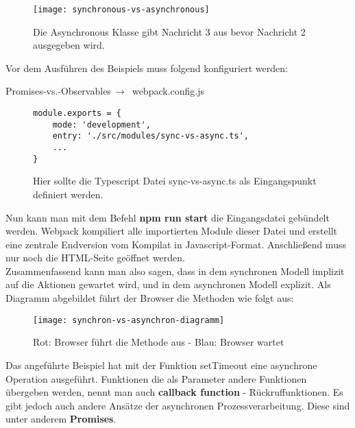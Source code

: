 \begin{figure}[H]
\centering
\texttt{[image: synchronous-vs-asynchronous]}
\caption{Die Asynchronous Klasse gibt Nachricht 3 aus bevor Nachricht 2 ausgegeben wird.}
\end{figure}

\noindent
Vor dem Ausführen des Beispiels muss folgend konfiguriert werden:
 \begin{center}
     Promises-vs.-Observables$\,\to\,$ webpack.config.js
 \end{center}

\begin{figure}[h!]
\begin{lstlisting}
module.exports = {
    mode: 'development',
    entry: './src/modules/sync-vs-async.ts',
    ...
}
\end{lstlisting}
\caption{Hier sollte die Typescript Datei sync-vs-async.ts als Eingangspunkt definiert werden.}
\end{figure}

\noindent
Nun kann man mit dem Befehl \textbf{npm run start} die Eingangsdatei gebündelt werden. Webpack kompiliert alle importierten Module dieser Datei und erstellt eine zentrale Endversion vom Kompilat in Javascript-Format. Anschließend muss nur noch die HTML-Seite geöffnet werden. \\

\noindent
Zusammenfassend kann man also sagen, dass in dem synchronen Modell implizit auf die Aktionen gewartet wird, und in dem asynchronen Modell explizit. Als Diagramm abgebildet führt der Browser die Methoden wie folgt aus:

\begin{center}
\begin{figure}[H]
\texttt{[image: synchron-vs-asynchron-diagramm]}
\caption{Rot: Browser führt die Methode aus - Blau: Browser wartet}
\end{figure}
\end{center}

\noindent
Das angeführte Beispiel hat mit der Funktion setTimeout eine asynchrone Operation ausgeführt. Funktionen die als Parameter andere Funktionen übergeben werden, nennt man auch \textbf{callback function} - Rückruffunktionen. Es gibt jedoch auch andere Ansätze der asynchronen Prozessverarbeitung. Diese sind unter anderem \textbf{Promises}.





